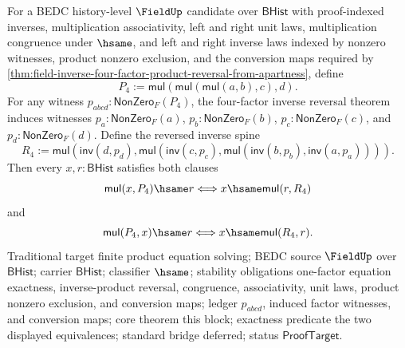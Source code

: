 \begin{theorem}
\label{thm:field-four-factor-product-equation-exact-from-apartness}
For a BEDC history-level $\FieldUp$ candidate over $\mathsf{BHist}$ with
proof-indexed inverses, multiplication associativity, left and right unit laws,
multiplication congruence under $\hsame$, and left and right inverse laws
indexed by nonzero witnesses, product nonzero exclusion, and the conversion
maps required by
\autoref{thm:field-inverse-four-factor-product-reversal-from-apartness}, define
$$
P_4:=\mathsf{mul}(\mathsf{mul}(\mathsf{mul}(a,b),c),d).
$$
For any witness $p_{abcd}:\mathsf{NonZero}_F(P_4)$, the four-factor inverse
reversal theorem induces witnesses $p_a:\mathsf{NonZero}_F(a)$,
$p_b:\mathsf{NonZero}_F(b)$, $p_c:\mathsf{NonZero}_F(c)$, and
$p_d:\mathsf{NonZero}_F(d)$. Define the reversed inverse spine
$$
R_4:=
\mathsf{mul}(\mathsf{inv}(d,p_d),
\mathsf{mul}(\mathsf{inv}(c,p_c),
\mathsf{mul}(\mathsf{inv}(b,p_b),\mathsf{inv}(a,p_a)))).
$$
Then every $x,r:\mathsf{BHist}$ satisfies both clauses
$$
\mathsf{mul}(x,P_4)\hsame r
\Longleftrightarrow
x\hsame \mathsf{mul}(r,R_4)
$$
and
$$
\mathsf{mul}(P_4,x)\hsame r
\Longleftrightarrow
x\hsame \mathsf{mul}(R_4,r).
$$
Traditional target finite product equation solving; BEDC source $\FieldUp$ over
$\mathsf{BHist}$; carrier $\mathsf{BHist}$; classifier $\hsame$; stability
obligations one-factor equation exactness, inverse-product reversal,
congruence, associativity, unit laws, product nonzero exclusion, and conversion
maps; ledger $p_{abcd}$, induced factor witnesses, and conversion maps; core
theorem this block; exactness predicate the two displayed equivalences; standard
bridge deferred; status $\mathsf{ProofTarget}$.
\end{theorem}
